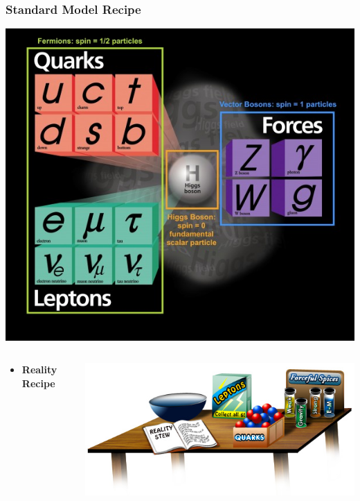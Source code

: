 \documentclass{beamer}
\begin{document}
\begin{frame}
\frametitle{\Huge{Standard Model Recipe}}
\centering
 \mbox{\includegraphics[height=0.40\textwidth, width=0.75\linewidth]{THESISPLOTS/FULL-SM-P.jpg}}
\begin{minipage}[b]{0.95\paperwidth}
    \begin{columns}
      \begin{column}{0.60\paperwidth}
       \begin{itemize}
       \item \textcolor{UMN@Maroon}{\textbf{\huge{Reality Recipe}}}
        \end{itemize}
      \end{column}   
      \begin{column}{0.45\paperwidth}
      \mbox{\includegraphics[height=0.85\textwidth, width=0.70\linewidth]{THESISPLOTS/New-Physics-PLOTS/Reality_Recipe_stew.jpg}}

\end{column}
\end{columns}
\end{minipage}
\end{frame}
\end{document}

